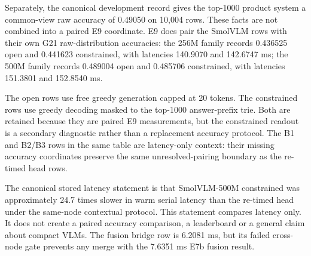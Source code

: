 Separately, the canonical development record gives the top-1000 product
system a common-view raw accuracy of 0.49050 on 10,004 rows. These facts are
not combined into a paired E9 coordinate. E9 does pair the SmolVLM rows with
their own G21 raw-distribution accuracies: the 256M
family records 0.436525 open and 0.441623 constrained, with latencies 140.9070
and 142.6747 ms; the 500M family records 0.489004 open and 0.485706
constrained, with latencies 151.3801 and 152.8540 ms.

The open rows use free greedy generation capped at 20 tokens. The constrained
rows use greedy decoding masked to the top-1000 answer-prefix trie. Both are
retained because they are paired E9 measurements, but the constrained readout
is a secondary diagnostic rather than a replacement accuracy protocol. The
B1 and B2/B3 rows in the same table are latency-only context: their missing
accuracy coordinates preserve the same unresolved-pairing boundary as the
re-timed head rows.

The canonical stored latency statement is that SmolVLM-500M constrained was
approximately 24.7 times slower in warm serial latency than the re-timed head
under the same-node contextual protocol. This statement compares latency only.
It does not create a paired accuracy comparison, a leaderboard or a general
claim about compact VLMs. The fusion bridge row is 6.2081 ms, but its failed
cross-node gate prevents any merge with the 7.6351 ms E7b fusion result.

\begin{table}[p]
\centering
\caption[E9 same-node timing context.]{Warm serial development timing on \texttt{otter159} under the E7b harness imported read-only. The block is contextual only: the fusion bridge failed, nodes are not merged, and no adjustment factor is used. Accuracy is shown only for the four canonically paired SmolVLM rows; re-timed product, fusion and B1/B2/B3 rows remain explicitly unpaired. No R1 answer-side latency exists, R2/R3 timings are not R1 cost, and E10 has no timing evidence.}
\label{tab:ch7-e9}
\begingroup\scriptsize\setlength{\tabcolsep}{0.65pt}
\makeatletter
\let\chSevenArrayParboxRestoreB\@arrayparboxrestore
\def\@arrayparboxrestore{\chSevenArrayParboxRestoreB\raggedright\let\\\tabularnewline}
\makeatother
\renewenvironment{longtable}[1]{\begin{tabular}{|p{0.14\textwidth}|p{0.15\textwidth}|p{0.10\textwidth}|p{0.115\textwidth}|p{0.085\textwidth}|p{0.07\textwidth}|p{0.10\textwidth}|p{0.07\textwidth}|}}{\end{tabular}}
\let\endhead\relax\renewcommand{\_}{\textunderscore\allowbreak}

\endgroup
\end{table}

